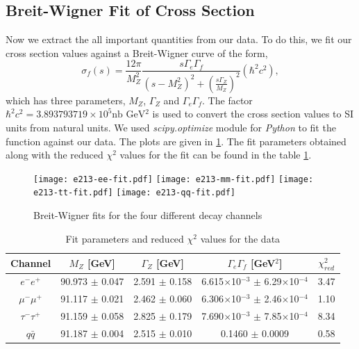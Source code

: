 \subsection{Breit-Wigner Fit of Cross Section}
Now we extract the all important quantities from our data. To do this, we fit our cross section values against a Breit-Wigner curve of the form,
\begin{equation}
    \sigma_f (s) = \frac{12\pi}{M_Z^2} \frac{s \Gamma_e \Gamma_f}{(s-M_Z^2)^2 + \left(\frac{s\Gamma_Z}{M_Z}\right)^2} (\hbar^2 c^2),
\end{equation}
which has three parameters, $M_Z$, $\Gamma_Z$ and $\Gamma_e\Gamma_f$. The factor $\hbar^2 c^2 = 3.893793719 \times 10^5 \text{nb GeV$^2$}$ is used to convert the cross section values to SI units from natural units. We used \textit{scipy.optimize} module for \textit{Python} to fit the function against our data. The plots are given in \ref{fig:bwfit}. The fit parameters obtained along with the reduced $\chi^2$ values for the fit can be found in the table \ref{table:bwfit}.\\
\begin{figure}[h!]
\begin{center}
    \texttt{[image: e213-ee-fit.pdf]}
    \texttt{[image: e213-mm-fit.pdf]}
    \texttt{[image: e213-tt-fit.pdf]}
    \texttt{[image: e213-qq-fit.pdf]}
\end{center}
\caption{Breit-Wigner fits for the four different decay channels}
\label{fig:bwfit}
\end{figure}
\begin{table}[h!]
\centering
\begin{tabular}{c|cccc}
\hline
Channel        & $M_Z$ {[}GeV{]}    & $\Gamma_Z$ {[}GeV{]} & $\Gamma_e\Gamma_f$ {[}GeV$^2${]}                   & $\chi_{red}^2$ \\ \hline
$e^-e^+$       & 90.973 $\pm$ 0.047 & 2.591 $\pm$ 0.158    & 6.615$\times$10$^{-3}$ $\pm$ 6.29$\times$10$^{-4}$ & 3.47           \\
$\mu^-\mu^+$   & 91.117 $\pm$ 0.021 & 2.462 $\pm$ 0.060    & 6.306$\times$10$^{-3}$ $\pm$ 2.46$\times$10$^{-4}$ & 1.10           \\
$\tau^-\tau^+$ & 91.159 $\pm$ 0.058 & 2.825 $\pm$ 0.179    & 7.690$\times$10$^{-3}$ $\pm$ 7.85$\times$10$^{-4}$ & 8.34           \\
$q\bar{q}$     & 91.187 $\pm$ 0.004 & 2.515 $\pm$ 0.010    & 0.1460 $\pm$ 0.0009                                & 0.58          \\ \hline
\end{tabular}
\caption[Breit-Wigner fit parameters and reduced $\chi^2$ values for the data]{Fit parameters and reduced $\chi^2$ values for the data}
\label{table:bwfit}
\end{table}
